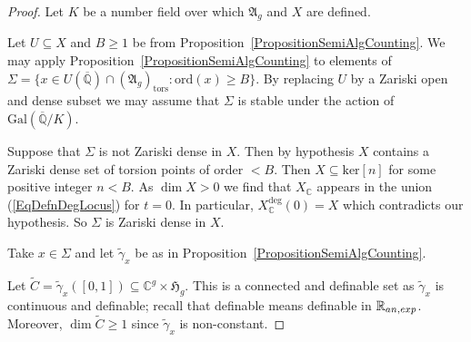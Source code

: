 \documentclass[12pt,oneside]{amsart}
\numberwithin{maincounter}{section}
\numberwithin{equation}{section}
\def\RR{\mathbb{R}}
\def\CC{\mathbb{C}}
\def\QQ{\mathbb{Q}}
\newcommand{\IC}{{\CC}}
\newcommand{\IRanexp}{{{\RR}_{\rm an,exp}}}
\newcommand{\IQbar}{{\overline{\QQ}}}
\renewcommand{\subset}{\subseteq} %
\newcommand{\philipp}[1]{{\color{blue} Philipp: #1}}
\begin{document}
\begin{proof}
  Let $K$ be a number field over which $\mathfrak{A}_g$ and $X$ are
  defined.


  Let $U\subset X$ and $B\ge 1$ be 
  from Proposition~\ref{PropositionSemiAlgCounting}. We may apply
  Proposition~\ref{PropositionSemiAlgCounting} to elements of $\Sigma=
  \{ x\in U(\IQbar) \cap (\mathfrak{A}_g)_{\mathrm{tors}} :
  \mathrm{ord}(x) \ge B\}$. By replacing $U$ by a Zariski open and dense
  subset we may assume that $\Sigma$ is stable under the action of
  $\mathrm{Gal}(\IQbar/K)$.

  Suppose that $\Sigma$ is not Zariski dense in $X$. Then by hypothesis $X$ contains a Zariski
  dense set of torsion points of order  $<B$. Then $X \subset
  \mathrm{ker}[n]$ for some positive integer $n< B$. As $\dim X >0$ we
  find that $X_\IC$ appears in the union (\ref{EqDefnDegLocus}) for $t=0$. In particular,  
  $X_\IC^{\mathrm{deg}}(0)=X$ which contradicts our hypothesis.
  So $\Sigma$ is Zariski dense in $X$. 


  Take $x \in \Sigma$ and %
  let $\tilde\gamma_x$ be as in Proposition~\ref{PropositionSemiAlgCounting}.

  Let $\tilde{C} = \tilde\gamma_x([0,1]) \subset\IC^g\times\mathfrak{H}_g$. This is a connected and
  definable set as $\tilde\gamma_x$ is continuous and definable;
  recall that definable means definable in $\IRanexp$.
  Moreover, $\dim\tilde{C} \ge 1$ since $\tilde\gamma_x$ is non-constant.


\end{proof}
\end{document}
